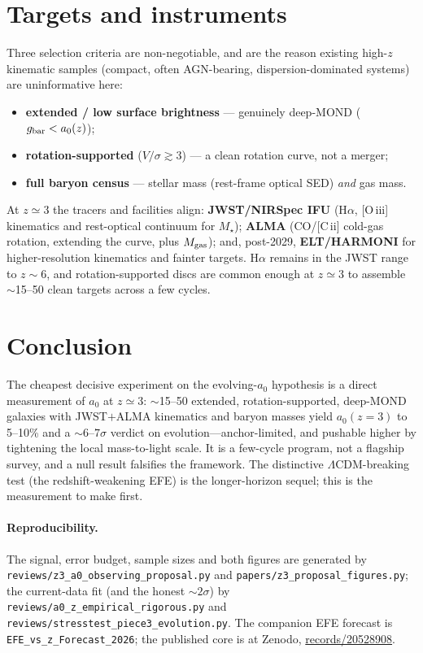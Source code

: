 \documentclass[11pt]{article}
\newcommand{\az}{a_0}
\begin{document}
\section{Targets and instruments}
Three selection criteria are non-negotiable, and are the reason existing high-$z$ kinematic samples
(compact, often AGN-bearing, dispersion-dominated systems) are uninformative here:
\begin{itemize}\itemsep1pt
\item \textbf{extended / low surface brightness} --- genuinely deep-MOND ($g_{\rm bar}<\az(z)$);
\item \textbf{rotation-supported} ($V/\sigma\gtrsim3$) --- a clean rotation curve, not a merger;
\item \textbf{full baryon census} --- stellar mass (rest-frame optical SED) \emph{and} gas mass.
\end{itemize}
At $z\simeq3$ the tracers and facilities align: \textbf{JWST/NIRSpec IFU} (H$\alpha$, [O\,{\sc iii}]
kinematics and rest-optical continuum for $M_\star$); \textbf{ALMA} (CO/[C\,{\sc ii}] cold-gas
rotation, extending the curve, plus $M_{\rm gas}$); and, post-2029, \textbf{ELT/HARMONI} for
higher-resolution kinematics and fainter targets. H$\alpha$ remains in the JWST range to $z\sim6$,
and rotation-supported discs are common enough at $z\simeq3$ to assemble $\sim$15--50 clean targets
across a few cycles.

\section{Conclusion}
The cheapest decisive experiment on the evolving-$\az$ hypothesis is a direct measurement of $\az$
at $z\simeq3$: $\sim$15--50 extended, rotation-supported, deep-MOND galaxies with JWST$+$ALMA
kinematics and baryon masses yield $\az(z{=}3)$ to 5--10\% and a $\sim6$--$7\sigma$ verdict on
evolution---anchor-limited, and pushable higher by tightening the local mass-to-light scale. It is a
few-cycle program, not a flagship survey, and a null result falsifies the framework. The distinctive
$\Lambda$CDM-breaking test (the redshift-weakening EFE) is the longer-horizon sequel; this is the
measurement to make first.

\paragraph{Reproducibility.} The signal, error budget, sample sizes and both figures are generated
by \texttt{reviews/z3\_a0\_observing\_proposal.py} and \texttt{papers/z3\_proposal\_figures.py};
the current-data fit (and the honest $\sim2\sigma$) by \texttt{reviews/a0\_z\_empirical\_rigorous.py}
and \texttt{reviews/stresstest\_piece3\_evolution.py}. The companion EFE forecast is
\texttt{EFE\_vs\_z\_Forecast\_2026}; the published core is at Zenodo, \href{https://zenodo.org/records/20528908}{records/20528908}.
\end{document}
